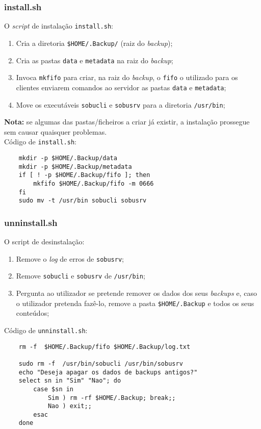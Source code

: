 \documentclass[a4paper,12pt,titlepage,draft,portuguese]{article}
\begin{document}
\newpage
\subsubsection{install.sh}
O \emph{script} de instalação \texttt{install.sh}:
	\begin{enumerate}
		\item Cria a diretoria \texttt{\$HOME/.Backup/} (raiz do \emph{backup});
		\item Cria as pastas \texttt{data} e \texttt{metadata} na raiz do \emph{backup};
		\item Invoca \texttt{mkfifo} para criar, na raiz do \emph{backup}, o \texttt{fifo} o utilizado para os clientes enviarem comandos ao servidor as pastas \texttt{data} e \texttt{metadata};
		\item Move os executáveis \texttt{sobucli} e \texttt{sobusrv} para a diretoria \texttt{/usr/bin};
	\end{enumerate}
\textbf{Nota:} se algumas das pastas/ficheiros a criar já existir, a instalação prossegue sem causar quaisquer problemas. 
\\Código de \texttt{install.sh}:
	\begin{verbatim}
	mkdir -p $HOME/.Backup/data
	mkdir -p $HOME/.Backup/metadata
	if [ ! -p $HOME/.Backup/fifo ]; then
		mkfifo $HOME/.Backup/fifo -m 0666
	fi
	sudo mv -t /usr/bin sobucli sobusrv
	\end{verbatim}

\subsubsection{unninstall.sh}
O script de desinstalação:
	\begin{enumerate}
		\item Remove o \emph{log} de erros de \texttt{sobusrv};
		\item Remove \texttt{sobucli} e \texttt{sobusrv} de \texttt{/usr/bin};
		\item Pergunta ao utilizador se pretende remover os dados dos seus \emph{backups} e, caso o utilizador pretenda fazê-lo, remove a pasta \texttt{\$HOME/.Backup} e todos os seus conteúdos;
	\end{enumerate}
Código de \texttt{unninstall.sh}:
	\begin{verbatim}
	rm -f  $HOME/.Backup/fifo $HOME/.Backup/log.txt

	sudo rm -f  /usr/bin/sobucli /usr/bin/sobusrv 
	echo "Deseja apagar os dados de backups antigos?"
	select sn in "Sim" "Nao"; do
	    case $sn in
	        Sim ) rm -rf $HOME/.Backup; break;;
	        Nao ) exit;;
	    esac
	done
	\end{verbatim}
\end{document}
